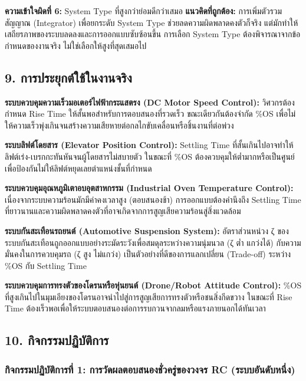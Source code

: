 \textbf{ความเข้าใจผิดที่ 6:} System Type ที่สูงกว่าย่อมดีกว่าเสมอ
\textbf{แนวคิดที่ถูกต้อง:} การเพิ่มตัวรวมสัญญาณ (Integrator) เพื่อยกระดับ System Type ช่วยลดความผิดพลาดคงตัวก็จริง แต่มักทำให้เสถียรภาพของระบบลดลงและการออกแบบซับซ้อนขึ้น การเลือก System Type ต้องพิจารณาจากข้อกำหนดของงานจริง ไม่ใช่เลือกให้สูงที่สุดเสมอไป



\subsection{9. การประยุกต์ใช้ในงานจริง}

\textbf{ระบบควบคุมความเร็วมอเตอร์ไฟฟ้ากระแสตรง (DC Motor Speed Control):} วิศวกรต้องกำหนด Rise Time ให้สั้นพอสำหรับการตอบสนองที่รวดเร็ว ขณะเดียวกันต้องจำกัด \%OS เพื่อไม่ให้ความเร็วพุ่งเกินจนสร้างความเสียหายต่อกลไกขับเคลื่อนหรือชิ้นงานที่ต่อพ่วง

\textbf{ระบบลิฟต์โดยสาร (Elevator Position Control):} Settling Time ที่สั้นเกินไปอาจทำให้ลิฟต์เร่ง-เบรกกะทันหันจนผู้โดยสารไม่สบายตัว ในขณะที่ \%OS ต้องควบคุมให้ต่ำมากหรือเป็นศูนย์ เพื่อป้องกันไม่ให้ลิฟต์หยุดเลยตำแหน่งชั้นที่กำหนด

\textbf{ระบบควบคุมอุณหภูมิเตาอบอุตสาหกรรม (Industrial Oven Temperature Control):} เนื่องจากระบบความร้อนมักมีค่าคงเวลาสูง (ตอบสนองช้า) การออกแบบต้องคำนึงถึง Settling Time ที่ยาวนานและความผิดพลาดคงตัวที่อาจเกิดจากการสูญเสียความร้อนสู่สิ่งแวดล้อม

\textbf{ระบบกันสะเทือนรถยนต์ (Automotive Suspension System):} อัตราส่วนหน่วง ζ ของระบบกันสะเทือนถูกออกแบบอย่างระมัดระวังเพื่อสมดุลระหว่างความนุ่มนวล (ζ ต่ำ แกว่งได้) กับความมั่นคงในการควบคุมรถ (ζ สูง ไม่แกว่ง) เป็นตัวอย่างที่ดีของการแลกเปลี่ยน (Trade-off) ระหว่าง \%OS กับ Settling Time

\textbf{ระบบควบคุมการทรงตัวของโดรนหรือหุ่นยนต์ (Drone/Robot Attitude Control):} \%OS ที่สูงเกินไปในมุมเอียงของโดรนอาจนำไปสู่การสูญเสียการทรงตัวหรือชนสิ่งกีดขวาง ในขณะที่ Rise Time ต้องเร็วพอเพื่อให้ระบบตอบสนองต่อการรบกวนจากลมหรือแรงภายนอกได้ทันเวลา

\newpage

\subsection{10. กิจกรรมปฏิบัติการ}

\subsubsection{กิจกรรมปฏิบัติการที่ 1: การวัดผลตอบสนองชั่วครู่ของวงจร RC (ระบบอันดับหนึ่ง)}

